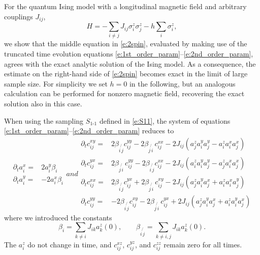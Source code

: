 \documentclass[aps,prl,showpacs,amsmath,amssymb,superscriptaddress,reprint,10pt]{revtex4-1}
\begin{document}
For the quantum Ising model with a longitudinal magnetic field and arbitrary couplings $J_{ij}$,
\begin{equation}
H=-\sum_{i\neq j}J_{ij}\sigma_i^z\sigma_j^z - h\sum_i\sigma_i^z,
\end{equation}
we show that the middle equation in \eqref{e:2spin}, evaluated by making use of the truncated time evolution equations \eqref{e:1st_order_param}--\eqref{e:2nd_order_param}, agrees with the exact analytic solution of the Ising model. As a consequence, the estimate on the right-hand side of \eqref{e:2spin} becomes exact in the limit of large sample size.
For simplicity we set $h=0$ in the following, but an analogous calculation can be performed for nonzero magnetic field, recovering the exact solution also in this case.

When using the sampling $S_{\text{1-1}}$ defined in \eqref{e:S11}, the system of equations \eqref{e:1st_order_param}--\eqref{e:2nd_order_param} reduces to
\begin{subequations}
\begin{equation}
\begin{split}
 \partial_t a_i^x=&2a_i^y\beta_i\\
 \partial_t a_i^y=&-2a_i^x\beta_i
\end{split}
\end{equation}
and
\begin{equation}\label{corr_Ising}
\begin{split}
 \partial_t c_{ij}^{xy}=&2\beta_{i\not{\,j}}c_{ij}^{yy}-2\beta_{j\not{\,i}}\,c_{ij}^{xx}-2J_{ij}(a_j^za_i^ya_j^y-a_i^za_i^xa_j^x)\\
 \partial_t c_{ij}^{yx}=&2\beta_{j\not{\,i}}\,c_{ij}^{yy}-2\beta_{i\not{\,j}}c_{ij}^{xx}-2J_{ij}(a_i^za_i^ya_j^y-a_j^za_i^xa_j^x)\\
 \partial_t c_{ij}^{xx}=&2\beta_{i\not{\,j}}c_{ij}^{yx}+2\beta_{j\not{\,i}}\,c_{ij}^{xy}-2J_{ij}(a_j^za_i^ya_j^x+a_i^za_i^xa_j^y)\\
 \partial_t c_{ij}^{yy}=&-2\beta_{i\not{\,j}}c_{ij}^{xy}-2\beta_{j\not{\,i}}\,c_{ij}^{yx}+2J_{ij}(a_j^za_i^ya_j^x+a_i^za_i^ya_j^x)
\end{split}
\end{equation}
\end{subequations}
where we introduced the constants
\begin{equation}
\beta_{i}=\sum_{k\neq i} J_{ik} a_k^z(0),\qquad \beta_{i\not{\,j}}=\sum_{k\neq i,j} J_{ik} a_k^z(0).
\end{equation}
The $a_i^z$ do not change in time, and $c_{ij}^{xz}$, $c_{ij}^{yz}$, and $c_{ij}^{zz}$ remain zero for all times.
\end{document}
